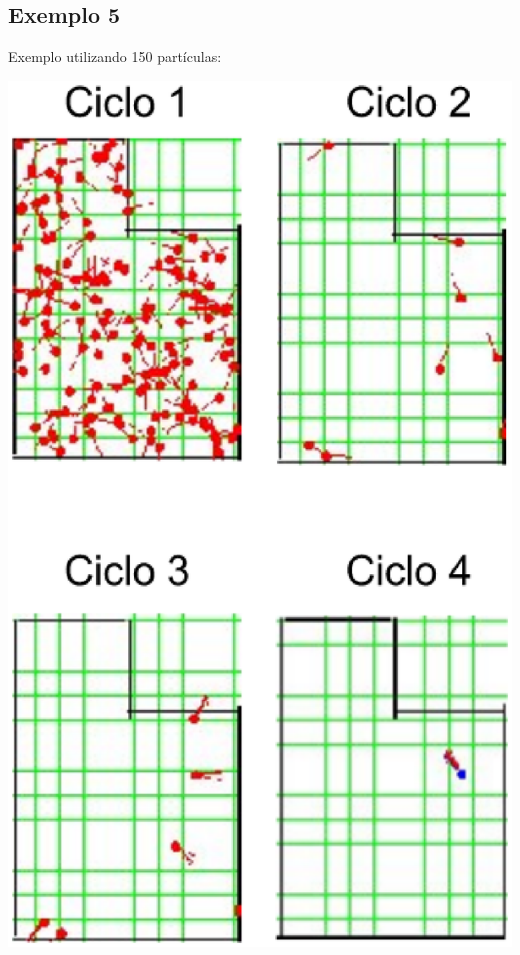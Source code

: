 \subsection{Exemplo 5}

Exemplo utilizando 150 partículas:

{\centering
\includegraphics[scale=0.4]{figuras/cen1_ex5.eps}
\label{img:cen1_ex5}
\par}
